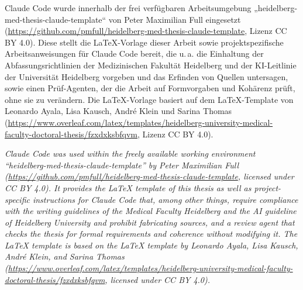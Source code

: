 \bigskip

\noindent Claude Code wurde innerhalb der frei verfügbaren Arbeitsumgebung
„heidelberg-med-thesis-claude-template“ von Peter Maximilian Full
eingesetzt (\url{https://github.com/pmfull/heidelberg-med-thesis-claude-template},
Lizenz CC BY 4.0). Diese stellt die LaTeX-Vorlage dieser Arbeit sowie
projektspezifische Arbeitsanweisungen für Claude Code bereit, die u.\,a. die
Einhaltung der Abfassungsrichtlinien der Medizinischen Fakultät Heidelberg und
der KI-Leitlinie der Universität Heidelberg vorgeben und das Erfinden von
Quellen untersagen, sowie einen Prüf-Agenten, der die Arbeit auf Formvorgaben
und Kohärenz prüft, ohne sie zu verändern. Die LaTeX-Vorlage basiert auf dem
LaTeX-Template von Leonardo Ayala, Lisa Kausch, André Klein und Sarina Thomas
(\url{https://www.overleaf.com/latex/templates/heidelberg-university-medical-faculty-doctoral-thesis/fzxdxksbfqvm},
Lizenz CC BY 4.0).

\emph{\small\color{dkfzgray2} Claude Code was used within the freely available
working environment “heidelberg-med-thesis-claude-template” by Peter
Maximilian Full
(\url{https://github.com/pmfull/heidelberg-med-thesis-claude-template},
licensed under CC BY 4.0). It provides the LaTeX template of this thesis as
well as project-specific instructions for Claude Code that, among other things,
require compliance with the writing guidelines of the Medical Faculty
Heidelberg and the AI guideline of Heidelberg University and prohibit
fabricating sources, and a review agent that checks the thesis for formal
requirements and coherence without modifying it. The LaTeX template is based on
the LaTeX template by Leonardo Ayala, Lisa Kausch, André Klein, and Sarina
Thomas
(\url{https://www.overleaf.com/latex/templates/heidelberg-university-medical-faculty-doctoral-thesis/fzxdxksbfqvm},
licensed under CC BY 4.0).}
